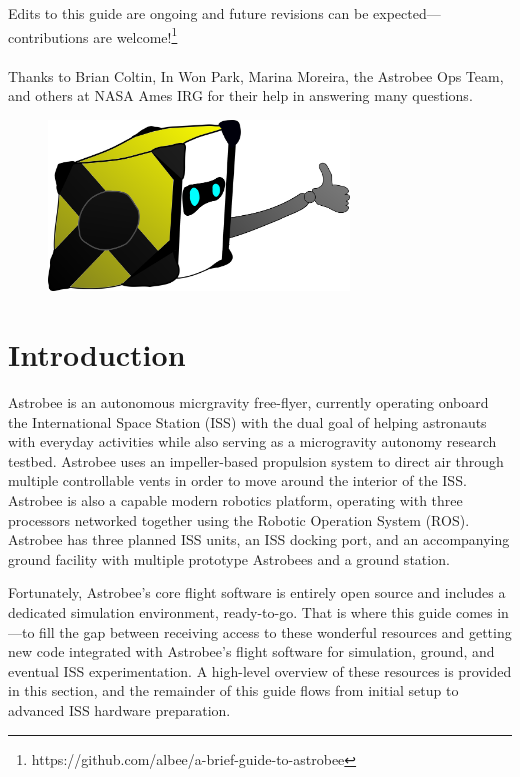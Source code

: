 \documentclass{article}
\begin{document}
\\
\\
\indent Edits to this guide are ongoing and future revisions can be expected---contributions are welcome!\footnote{https://github.com/albee/a-brief-guide-to-astrobee} 
\\
\\
\indent Thanks to Brian Coltin, In Won Park, Marina Moreira, the Astrobee Ops Team, and others at NASA Ames IRG for their help in answering many questions.
\vspace{1cm}
\begin{figure}[hb!]
    \centering
    \includegraphics[width=8cm]{img/astrobee_mascot.png}
\end{figure}
\newpage

\tableofcontents

\newpage

\section{Introduction}

Astrobee is an autonomous micrgravity free-flyer, currently operating onboard the International Space Station (ISS) with the dual goal of helping astronauts with everyday activities while also serving as a microgravity autonomy research testbed. Astrobee uses an impeller-based propulsion system to direct air through multiple controllable vents in order to move around the interior of the ISS. Astrobee is also a capable modern robotics platform, operating with three processors networked together using the Robotic Operation System (ROS). Astrobee has three planned ISS units, an ISS docking port, and an accompanying ground facility with multiple prototype Astrobees and a ground station.

Fortunately, Astrobee's core flight software is entirely open source and includes a dedicated simulation environment, ready-to-go. That is where this guide comes in---to fill the gap between receiving access to these wonderful resources and getting new code integrated with Astrobee's flight software for simulation, ground, and eventual ISS experimentation. A high-level overview of these resources is provided in this section, and the remainder of this guide flows from initial setup to advanced ISS hardware preparation.
\end{document}
